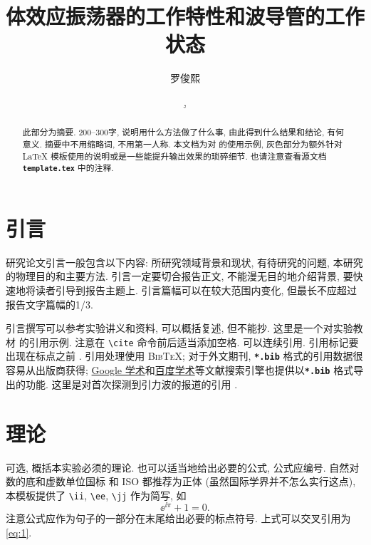 \documentclass[font=fandol]{mpltx}
\makeatletter
\newcommand{\note}[1]{{\color{gray}#1}}
\newcommand*\cs[1]{\texttt{\textbackslash #1}}
\newcommand*\file[1]{\textbf{\texttt{#1}}}
\newcommand\releasedate{%
    \href{https://github.com/CastleStar14654/PKUMpLtX/releases/tag/\mpltx@fileversion}%
        {\mpltx@filedate, \mpltx@fileversion}}
\makeatother
\begin{document}
\title{体效应振荡器的工作特性和波导管的工作状态} %
\author{罗俊熙} %
\date{\releasedate}
\begin{abstract}
	此部分为摘要.
	200--300字, 说明用什么方法做了什么事, 由此得到什么结果和结论, 有何意义.
	摘要中不用缩略词, 不用第一人称.
	\note{本文档为对 \href{https://github.com/CastleStar14654/PKUMpLtX}{\pkg*{PKUMpLtX}} 的使用示例, 灰色部分为额外针对 \LaTeX{} 模板使用的说明或是一些能提升输出效果的琐碎细节.
		也请注意查看源文档 \file{template.tex} 中的注释.}
\end{abstract}

\maketitle

\section{引言}

研究论文引言一般包含以下内容:
所研究领域背景和现状,
有待研究的问题,
本研究的物理目的和主要方法.
引言一定要切合报告正文, 不能漫无目的地介绍背景, 要快速地将读者引导到报告主题上.
引言篇幅可以在较大范围内变化, 但最长不应超过报告文字篇幅的1/3.

引言撰写可以参考实验讲义和资料, 可以概括复述, 但不能抄.
\note{这里是一个对实验教材 \cite{jindaishiyan} 的引用示例.}
\note{注意在 \cs{cite} 命令前后适当添加空格.
	可以连续引用.
	引用标记要出现在标点之前 \cite{GBT7714,pr}.
	引用处理使用 \textsc{Bib\TeX};
	对于外文期刊, \file{*.bib} 格式的引用数据很容易从出版商获得;
	\href{https://scholar.google.com}{Google 学术}和\href{https://xueshu.baidu.com}{百度学术}等文献搜索引擎也提供以\file{*.bib} 格式导出的功能.
	这里是对首次探测到引力波的报道的引用 \cite{PhysRevLett.116.061102}.}

\section{理论}\label{sec:theory}
可选, 概括本实验必须的理论.
也可以适当地给出必要的公式, 公式应编号.
\note{自然对数的底和虚数单位国标 \cite{GBT3102.11} 和 ISO \cite{ISO80000-2} 都推荐为正体 (虽然国际学界并不怎么实行这点), 本模板提供了 \cs{ii}, \cs{ee}, \cs{jj} 作为简写, 如
	\begin{equation}\label{eq:1}
		\ee^{\ii\pi}+1=0.
	\end{equation}
	注意公式应作为句子的一部分在末尾给出必要的标点符号.
	上式可以交叉引用为\autoref{eq:1}.}
\end{document}

